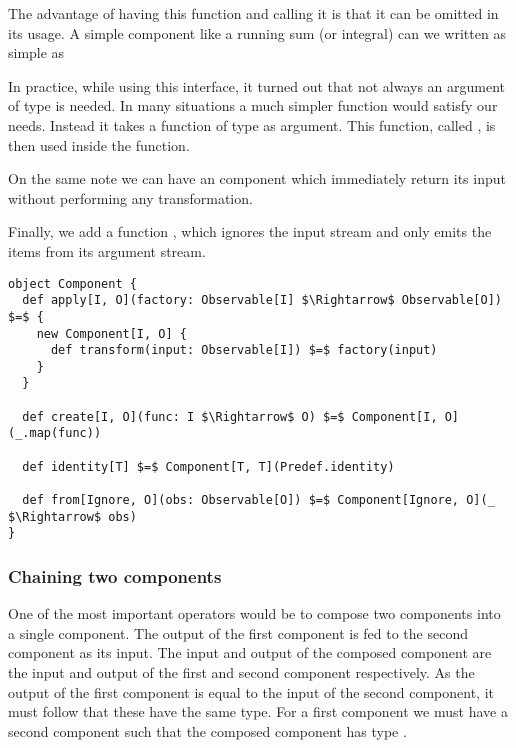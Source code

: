 The advantage of having this function and calling it  is that it can be omitted in its usage. A simple component like a running sum (or integral) can we written as simple as 

In practice, while using this interface, it turned out that not always an argument of type  is needed. In many situations a much simpler function would satisfy our needs. Instead it takes a function of type  as argument. This function, called , is then used inside the  function.

On the same note we can have an  component which immediately return its input without performing any transformation.

Finally, we add a function , which ignores the input stream and only emits the items from its argument stream.

\begin{lstlisting}[style=ScalaStyle, caption={Various ways to create a \comp}, label={lst:creating-component}]
object Component {
  def apply[I, O](factory: Observable[I] $\Rightarrow$ Observable[O]) $=$ {
    new Component[I, O] {
      def transform(input: Observable[I]) $=$ factory(input)
    }
  }

  def create[I, O](func: I $\Rightarrow$ O) $=$ Component[I, O](_.map(func))
  
  def identity[T] $=$ Component[T, T](Predef.identity)
  
  def from[Ignore, O](obs: Observable[O]) $=$ Component[Ignore, O](_ $\Rightarrow$ obs)
}
\end{lstlisting}

\subsubsection{Chaining two components}
One of the most important operators would be to compose two components into a single component. The output of the first component is fed to the second component as its input. The input and output of the composed component are the input and output of the first and second component respectively. As the output of the first component is equal to the input of the second component, it must follow that these have the same type. For a first component  we must have a second component  such that the composed component  has type .

